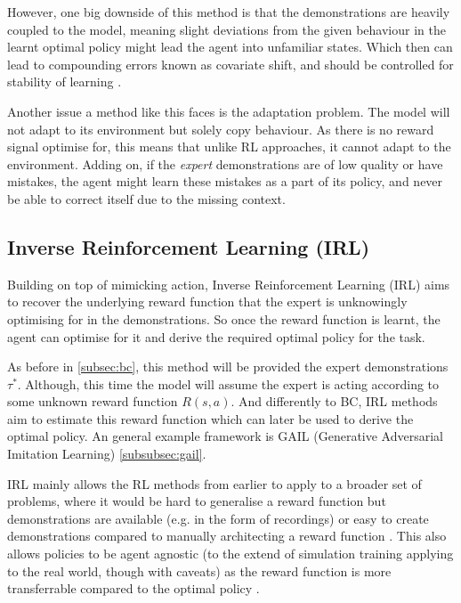  However, one big downside of this method is that the demonstrations are heavily coupled to the model, meaning slight deviations from the given behaviour in the learnt optimal policy might lead the agent into unfamiliar states. Which then can lead to compounding errors known as covariate shift, and should be controlled for stability of learning \cite{mehta2024stablebccontrollingcovariateshift}. 
 \label{para:covariate-shift}
 
 Another issue a method like this faces is the adaptation problem. The model will not adapt to its environment but solely copy behaviour. As there is no reward signal optimise for, this means that unlike RL approaches, it cannot adapt to the environment. Adding on, if the \emph{expert} demonstrations are of low quality or have mistakes, the agent might learn these mistakes as a part of its policy, and never be able to correct itself due to the missing context.


\subsection{Inverse Reinforcement Learning (IRL)}
Building on top of mimicking action, Inverse Reinforcement Learning (IRL) aims to recover the underlying reward function that the expert is unknowingly optimising for in the demonstrations. So once the reward function is learnt, the agent can optimise for it and derive the required optimal policy for the task.

 
As before in \ref{subsec:bc}, this method will be provided the expert demonstrations $\tau^*$. Although, this time the model will assume the expert is acting according to some unknown reward function $R\left(s, a\right)$. And differently to BC, IRL methods aim to estimate this reward function which can later be used to derive the optimal policy. An general example framework is GAIL (Generative Adversarial Imitation Learning) \ref{subsubsec:gail}.

IRL mainly allows the RL methods from earlier to apply to a broader set of problems, where it would be hard to generalise a reward function but demonstrations are available (e.g. in the form of recordings) or easy to create demonstrations compared to manually architecting a reward function \cite{ARORA2021103500}. This also allows policies to be agent agnostic (to the extend of simulation training applying to the real world, though with caveats) as the reward function is more transferrable compared to the optimal policy \cite{russell1998learning}.

